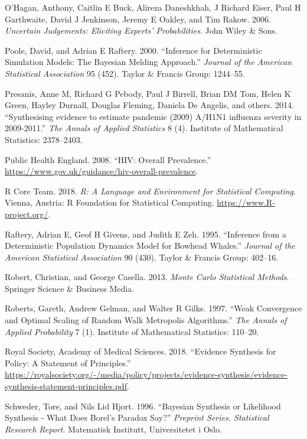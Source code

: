 \documentclass[11pt,]{book}
\begin{document}
\hypertarget{ref-o2006uncertain}{}
O'Hagan, Anthony, Caitlin E Buck, Alireza Daneshkhah, J Richard Eiser,
Paul H Garthwaite, David J Jenkinson, Jeremy E Oakley, and Tim Rakow.
2006. \emph{Uncertain Judgements: Eliciting Experts' Probabilities}.
John Wiley \& Sons.

\hypertarget{ref-poole2000inference}{}
Poole, David, and Adrian E Raftery. 2000. ``Inference for Deterministic
Simulation Models: The Bayesian Melding Approach.'' \emph{Journal of the
American Statistical Association} 95 (452). Taylor \& Francis Group:
1244--55.

\hypertarget{ref-presanis2014synthesising}{}
Presanis, Anne M, Richard G Pebody, Paul J Birrell, Brian DM Tom, Helen
K Green, Hayley Durnall, Douglas Fleming, Daniela De Angelis, and
others. 2014. ``Synthesising evidence to estimate pandemic (2009) A/H1N1
influenza severity in 2009-2011.'' \emph{The Annals of Applied
Statistics} 8 (4). Institute of Mathematical Statistics: 2378--2403.

\hypertarget{ref-phe}{}
Public Health England. 2008. ``HIV: Overall Prevalence.''
\url{https://www.gov.uk/guidance/hiv-overall-prevalence}.

\hypertarget{ref-r}{}
R Core Team. 2018. \emph{R: A Language and Environment for Statistical
Computing}. Vienna, Austria: R Foundation for Statistical Computing.
\url{https://www.R-project.org/}.

\hypertarget{ref-raftery1995inference}{}
Raftery, Adrian E, Geof H Givens, and Judith E Zeh. 1995. ``Inference
from a Deterministic Population Dynamics Model for Bowhead Whales.''
\emph{Journal of the American Statistical Association} 90 (430). Taylor
\& Francis Group: 402--16.

\hypertarget{ref-robert2013monte}{}
Robert, Christian, and George Casella. 2013. \emph{Monte Carlo
Statistical Methods}. Springer Science \& Business Media.

\hypertarget{ref-roberts1997weak}{}
Roberts, Gareth, Andrew Gelman, and Walter R Gilks. 1997. ``Weak
Convergence and Optimal Scaling of Random Walk Metropolis Algorithms.''
\emph{The Annals of Applied Probability} 7 (1). Institute of
Mathematical Statistics: 110--20.

\hypertarget{ref-royal}{}
Royal Society, Academy of Medical Sciences. 2018. ``Evidence Synthesis
for Policy: A Statement of Principles.''
\url{https://royalsociety.org/-/media/policy/projects/evidence-synthesis/evidence-synthesis-statement-principles.pdf}.

\hypertarget{ref-schweder1996bayesian}{}
Schweder, Tore, and Nils Lid Hjort. 1996. ``Bayesian Synthesis or
Likelihood Synthesis - What Does Borel's Paradox Say?'' \emph{Preprint
Series. Statistical Research Report}. Matematisk Institutt,
Universitetet i Oslo.
\end{document}
